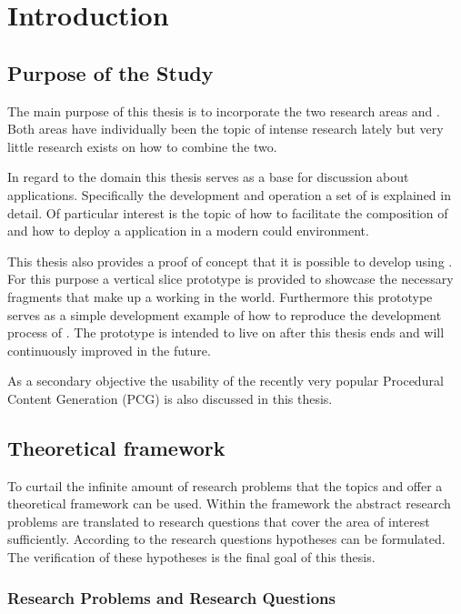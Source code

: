 \chapter{Introduction}

\section{Purpose of the Study}

The main purpose of this thesis is to incorporate the two research areas \mss{}
and \ogs{}. Both areas have individually been the topic of intense research
lately  but very little research exists on how to combine
the two.

In regard to the \mss{} domain this thesis serves as a base for discussion about
\ms{} applications. Specifically the development and operation a set of \mss{} is
explained in detail. Of particular interest is the topic of how to facilitate
the composition of \mss{} and how to deploy a \ms{} application in a modern could
environment.

This thesis also provides a proof of concept that it is possible to develop
\ogs{} using \mss{}. For this purpose a vertical slice prototype is provided to
showcase the necessary fragments that make up a working \og{} in the \ms{}
world. Furthermore this prototype serves as a simple development example of how
to reproduce the development process of \ogs{}. The prototype is intended to
live on after this thesis ends and will continuously improved in the future.

As a secondary objective the usability of the recently very popular
 Procedural Content Generation (PCG) is also discussed in
this thesis.

\section{Theoretical framework}

To curtail the infinite amount of research problems that the topics \ogs{} and
\mss{} offer a theoretical framework can be used. Within the framework the
abstract research problems are translated to research questions that cover the
area of interest sufficiently. According to the research questions hypotheses
can be formulated. The verification of these hypotheses is the final goal of
this thesis.

\subsection{Research Problems and Research Questions}
\label{sub:problems}

